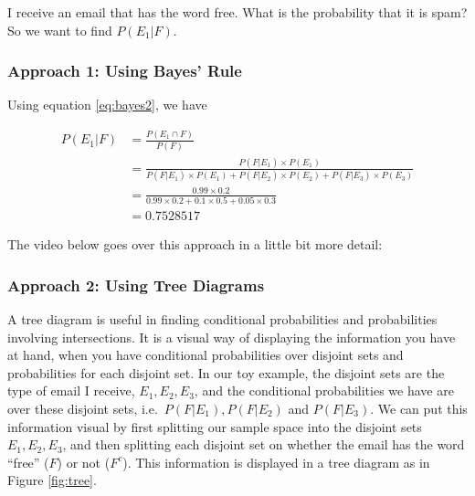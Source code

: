 \documentclass[
]{book}
\begin{document}
I receive an email that has the word free. What is the probability that it is spam? So we want to find \(P(E_1|F)\).

\subsubsection{Approach 1: Using Bayes' Rule}\label{approach-1-using-bayes-rule}

Using equation \eqref{eq:bayes2}, we have

\[
\begin{split}
P(E_1|F) &= \frac{P(E_1 \cap F)}{P(F)}\\
 &= \frac{P(F|E_1) \times P(E_1)}{P(F|E_1) \times P(E_1) + P(F|E_2) \times P(E_2) + P(F|E_3) \times P(E_3)} \\
&= \frac{0.99 \times 0.2}{0.99 \times 0.2 + 0.1 \times 0.5 + 0.05 \times 0.3}\\
&= 0.7528517
\end{split}
\]

The video below goes over this approach in a little bit more detail:

\subsubsection{Approach 2: Using Tree Diagrams}\label{approach-2-using-tree-diagrams}

A tree diagram is useful in finding conditional probabilities and probabilities involving intersections. It is a visual way of displaying the information you have at hand, when you have conditional probabilities over disjoint sets and probabilities for each disjoint set. In our toy example, the disjoint sets are the type of email I receive, \(E_1, E_2, E_3\), and the conditional probabilities we have are over these disjoint sets, i.e.~\(P(F|E_1), P(F|E_2)\) and \(P(F|E_3)\). We can put this information visual by first splitting our sample space into the disjoint sets \(E_1, E_2, E_3\), and then splitting each disjoint set on whether the email has the word ``free'' (\(F\)) or not (\(F^c\)). This information is displayed in a tree diagram as in Figure \ref{fig:tree}.
\end{document}
